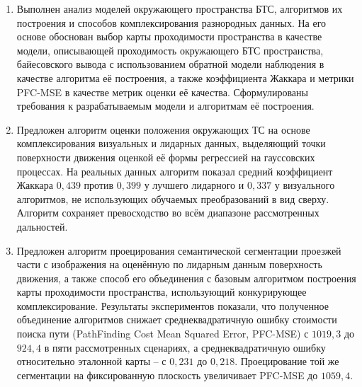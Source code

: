 \begin{enumerate}
	\item Выполнен анализ моделей окружающего пространства БТС, алгоритмов их построения и способов комплексирования разнородных данных. На его основе обоснован выбор карты проходимости пространства в качестве модели, описывающей проходимость окружающего БТС пространства, байесовского вывода с использованием обратной модели наблюдения в качестве алгоритма её построения, а также коэффициента Жаккара и метрики PFC-MSE в качестве метрик оценки её качества. Сформулированы требования к разрабатываемым модели и алгоритмам её построения.
	\item Предложен алгоритм оценки положения окружающих ТС на основе комплексирования визуальных и лидарных данных, выделяющий точки поверхности движения оценкой её формы регрессией на гауссовских процессах. На реальных данных алгоритм показал средний коэффициент Жаккара $0,439$ против $0,399$ у лучшего лидарного и $0,337$ у визуального алгоритмов, не использующих обучаемых преобразований в вид сверху. Алгоритм сохраняет превосходство во всём диапазоне рассмотренных дальностей.
	\item Предложен алгоритм проецирования семантической сегментации проезжей части с изображения на оценённую по лидарным данным поверхность движения, а также способ его объединения с базовым алгоритмом построения карты проходимости пространства, использующий конкурирующее комплексирование. Результаты экспериментов показали, что полученное объединение алгоритмов снижает среднеквадратичную ошибку стоимости поиска пути (PathFinding Cost Mean Squared Error, PFC-MSE) с $1019,3$ до $924,4$ в пяти рассмотренных сценариях, а среднеквадратичную ошибку относительно эталонной карты -- с $0,231$ до $0,218$. Проецирование той же сегментации на фиксированную плоскость увеличивает PFC-MSE до $1059,4$. 

\end{enumerate}
